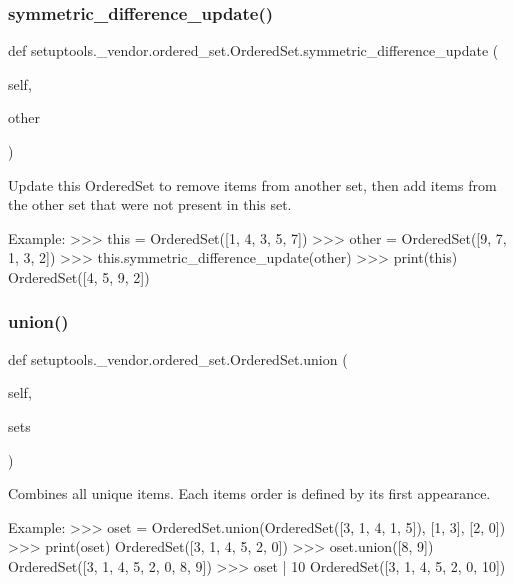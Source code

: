 \subsubsection{\texorpdfstring{symmetric\+\_\+difference\+\_\+update()}{symmetric\_difference\_update()}}
{\footnotesize\ttfamily def setuptools.\+\_\+vendor.\+ordered\+\_\+set.\+Ordered\+Set.\+symmetric\+\_\+difference\+\_\+update (\begin{DoxyParamCaption}\item[{}]{self,  }\item[{}]{other }\end{DoxyParamCaption})}

\begin{DoxyVerb}Update this OrderedSet to remove items from another set, then
add items from the other set that were not present in this set.

Example:
    >>> this = OrderedSet([1, 4, 3, 5, 7])
    >>> other = OrderedSet([9, 7, 1, 3, 2])
    >>> this.symmetric_difference_update(other)
    >>> print(this)
    OrderedSet([4, 5, 9, 2])
\end{DoxyVerb}
 \mbox{\label{classsetuptools_1_1__vendor_1_1ordered__set_1_1OrderedSet_adb947c911269a4f7fb76f4eeea2efa6e}} 
\subsubsection{\texorpdfstring{union()}{union()}}
{\footnotesize\ttfamily def setuptools.\+\_\+vendor.\+ordered\+\_\+set.\+Ordered\+Set.\+union (\begin{DoxyParamCaption}\item[{}]{self,  }\item[{}]{sets }\end{DoxyParamCaption})}

\begin{DoxyVerb}Combines all unique items.
Each items order is defined by its first appearance.

Example:
    >>> oset = OrderedSet.union(OrderedSet([3, 1, 4, 1, 5]), [1, 3], [2, 0])
    >>> print(oset)
    OrderedSet([3, 1, 4, 5, 2, 0])
    >>> oset.union([8, 9])
    OrderedSet([3, 1, 4, 5, 2, 0, 8, 9])
    >>> oset | {10}
    OrderedSet([3, 1, 4, 5, 2, 0, 10])
\end{DoxyVerb}
 \mbox{\label{classsetuptools_1_1__vendor_1_1ordered__set_1_1OrderedSet_a464866fb08988f25948761c50a438435}} 
